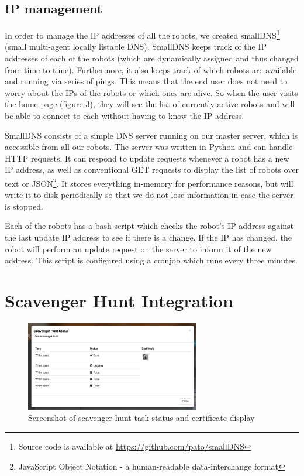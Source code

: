 \documentclass[
  oneside,
  11pt, a4paper,
  footinclude=true,
  headinclude=true,
  cleardoublepage=empty
]{article}
\begin{document}
\subsection{IP management}

In order to manage the IP addresses of all the robots, we created
smallDNS\footnote{Source code is available at
\url{https://github.com/pato/smallDNS}} (small multi-agent locally listable
DNS). SmallDNS keeps track of the IP addresses of each of the robots (which are
dynamically assigned and thus changed from time to time). Furthermore, it also
keeps track of which robots are available and running via series of pings. This
means that the end user does not need to worry about the IPs of the robots or
which ones are alive. So when the user visits the home page (figure 3), they
will see the list of currently active robots and will be able to connect to
each without having to know the IP address.

SmallDNS consists of a simple DNS server running on our master server, which is
accessible from all our robots. The server was written in Python and can
handle HTTP requests. It can respond to update requests whenever a robot has
a new IP address, as well as conventional GET requests to display the list of
robots over text or JSON\footnote{JavaScript Object Notation - a human-readable
data-interchange format}. It stores everything in-memory for performance
reasons, but will write it to disk periodically so that we do not lose
information in case the server is stopped.

Each of the robots has a bash script which checks the robot's IP address against the
last update IP address to see if there is a change. If the IP has changed, the robot
will perform an update request on the server to inform it of the new address. This
script is configured using a cronjob which runs every three minutes.

\section{Scavenger Hunt Integration}\label{sec:scav}

\begin{figure}
  \centering
  \includegraphics[width=3in]{scav_certs}
  \caption{Screenshot of scavenger hunt task status and certificate display}
  \label{fig:scav}
\end{figure}
\end{document}
